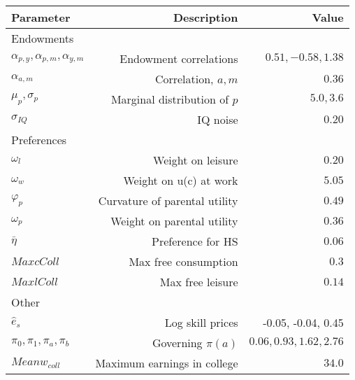 \begin{tabular}{lrr}
\hline
Parameter & Description  & Value  \\
\hline
Endowments &   &   \\
$\alpha_{p,y}, \alpha_{p,m}, \alpha_{y,m}$ & Endowment correlations  & $0.51, -0.58, 1.38$  \\
$\alpha_{a,m}$ & Correlation, $a,m$  & $0.36$  \\
$\mu_{p}, \sigma_{p}$ & Marginal distribution of $p$  & $5.0, 3.6$  \\
$\sigma_{IQ}$ & IQ noise  & $0.20$  \\
Preferences &   &   \\
$\omega_{l}$ & Weight on leisure  & $0.20$  \\
$\omega_{w}$ & Weight on u(c) at work  & $5.05$  \\
$\varphi_{p}$ & Curvature of parental utility  & $0.49$  \\
$\omega_{p}$ & Weight on parental utility  & $0.36$  \\
$\bar{\eta}$ & Preference for HS  & $0.06$  \\
$Max cColl$ & Max free consumption  & $0.3$  \\
$Max lColl$ & Max free leisure  & $0.14$  \\
Other &   &   \\
$\hat{e}_{s}$ & Log skill prices  & -0.05, -0.04, 0.45  \\
$\pi_{0}, \pi_{1}, \pi_{a}, \pi_{b}$ & Governing $\pi(a)$  & $0.06, 0.93, 1.62, 2.76$  \\
$Mean w_{coll}$ & Maximum earnings in college  & $34.0$  \\
\hline
\end{tabular}%

